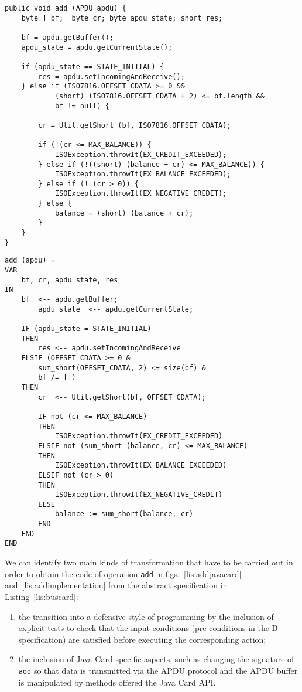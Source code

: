 \documentclass{entcs}
\begin{document}
\begin{lstlisting}
public void add (APDU apdu) { 
	byte[] bf;  byte cr; byte apdu_state; short res;
			
	bf = apdu.getBuffer();
	apdu_state = apdu.getCurrentState();
			
	if (apdu_state == STATE_INITIAL) {
		res = apdu.setIncomingAndReceive();
	} else if (ISO7816.OFFSET_CDATA >= 0 && 
			(short) (ISO7816.OFFSET_CDATA + 2) <= bf.length && 
			bf != null) {
				
		cr = Util.getShort (bf, ISO7816.OFFSET_CDATA);
				
		if (!(cr <= MAX_BALANCE)) {
			ISOException.throwIt(EX_CREDIT_EXCEEDED);
		} else if (!((short) (balance + cr) <= MAX_BALANCE)) {
			ISOException.throwIt(EX_BALANCE_EXCEEDED);
		} else if (! (cr > 0)) {
			ISOException.throwIt(EX_NEGATIVE_CREDIT);
		} else {
			balance = (short) (balance + cr);
		}
	} 
}
\end{lstlisting}

\begin{lstlisting}
add (apdu) = 
VAR 
	bf, cr, apdu_state, res
IN
	bf  <-- apdu.getBuffer;		
    	apdu_state  <-- apdu.getCurrentState;
	    
	IF (apdu_state = STATE_INITIAL) 
	THEN
		res <-- apdu.setIncomingAndReceive                
	ELSIF (OFFSET_CDATA >= 0 &
		sum_short(OFFSET_CDATA, 2) <= size(bf) & 
		bf /= [])
	THEN 
		cr  <-- Util.getShort(bf, OFFSET_CDATA);
		    
		IF not (cr <= MAX_BALANCE)
		THEN 
			ISOException.throwIt(EX_CREDIT_EXCEEDED)
		ELSIF not (sum_short (balance, cr) <= MAX_BALANCE)
		THEN 
			ISOException.throwIt(EX_BALANCE_EXCEEDED)
		ELSIF not (cr > 0)
		THEN 
			ISOException.throwIt(EX_NEGATIVE_CREDIT) 
		ELSE  
			balance := sum_short(balance, cr)
		END
	END
END
\end{lstlisting}


We can identify two main kinds of transformation that have to be
carried out in order to obtain the code of operation \texttt{add} in
figs.~\ref{lis:addjavacard} and~\ref{lis:addimplementation} from the
abstract specification in Listing~\ref{lis:buscard}:

\begin{enumerate}
\item the transition into a defensive style of programming by the
  inclusion of explicit tests to check that the input conditions (pre
  conditions in the B specification) are satisfied before executing
  the corresponding action;

\item the inclusion of Java Card specific aspects, such as changing
  the signature of \texttt{add} so that data is transmitted via the
  APDU protocol and the APDU buffer is manipulated by methods offered
  the Java Card API.

\end{enumerate}
\end{document}
